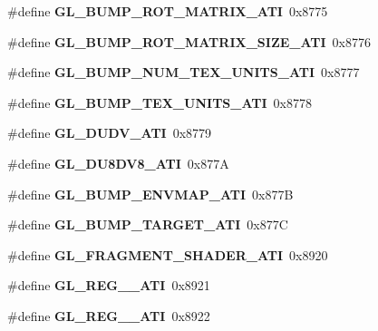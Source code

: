 \begin{DoxyCompactItemize}
\item 
\#define {\bfseries G\+L\+\_\+\+B\+U\+M\+P\+\_\+\+R\+O\+T\+\_\+\+M\+A\+T\+R\+I\+X\+\_\+\+A\+T\+I}~0x8775\label{_s_d_l__opengl_8h_a77423d183c0ab47e933a7ee52de91e15}

\item 
\#define {\bfseries G\+L\+\_\+\+B\+U\+M\+P\+\_\+\+R\+O\+T\+\_\+\+M\+A\+T\+R\+I\+X\+\_\+\+S\+I\+Z\+E\+\_\+\+A\+T\+I}~0x8776\label{_s_d_l__opengl_8h_a1861eb8f13e611587312f9d92912fcc9}

\item 
\#define {\bfseries G\+L\+\_\+\+B\+U\+M\+P\+\_\+\+N\+U\+M\+\_\+\+T\+E\+X\+\_\+\+U\+N\+I\+T\+S\+\_\+\+A\+T\+I}~0x8777\label{_s_d_l__opengl_8h_a7f2d7d8bcbecb67b568d9d0e6ee1a344}

\item 
\#define {\bfseries G\+L\+\_\+\+B\+U\+M\+P\+\_\+\+T\+E\+X\+\_\+\+U\+N\+I\+T\+S\+\_\+\+A\+T\+I}~0x8778\label{_s_d_l__opengl_8h_a20a1835bb5bf76a8c2908d1088cc135b}

\item 
\#define {\bfseries G\+L\+\_\+\+D\+U\+D\+V\+\_\+\+A\+T\+I}~0x8779\label{_s_d_l__opengl_8h_a4fd72382f5d3963b366eeff6466b3df2}

\item 
\#define {\bfseries G\+L\+\_\+\+D\+U8\+D\+V8\+\_\+\+A\+T\+I}~0x877\+A\label{_s_d_l__opengl_8h_afc066152583a53c75a16a64d7c53ca61}

\item 
\#define {\bfseries G\+L\+\_\+\+B\+U\+M\+P\+\_\+\+E\+N\+V\+M\+A\+P\+\_\+\+A\+T\+I}~0x877\+B\label{_s_d_l__opengl_8h_a1ba18a5050a1594fe69dccd7371056bd}

\item 
\#define {\bfseries G\+L\+\_\+\+B\+U\+M\+P\+\_\+\+T\+A\+R\+G\+E\+T\+\_\+\+A\+T\+I}~0x877\+C\label{_s_d_l__opengl_8h_a6ac2d3730e4b2511f42c69090fc8822b}

\item 
\#define {\bfseries G\+L\+\_\+\+F\+R\+A\+G\+M\+E\+N\+T\+\_\+\+S\+H\+A\+D\+E\+R\+\_\+\+A\+T\+I}~0x8920\label{_s_d_l__opengl_8h_af7dde0c98eaa8622272531f54113d05f}

\item 
\#define {\bfseries G\+L\+\_\+\+R\+E\+G\+\_\+\_\+\+A\+T\+I}~0x8921\label{_s_d_l__opengl_8h_ae605a0f343021e90edaec14a31998614}

\item 
\#define {\bfseries G\+L\+\_\+\+R\+E\+G\+\_\+\_\+\+A\+T\+I}~0x8922\label{_s_d_l__opengl_8h_aef6238b0189a7b228d4c5fb6161891e8}


\end{DoxyCompactItemize}
